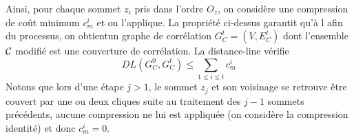 \documentclass[onecolumn, 12pt]{book}
\begin{document}
Ainsi, pour chaque sommet $z_i$ pris dans l'ordre $O_z$, on consid\`ere une compression de co\^ut minimum $c_m^i$ et on l'applique.
La propri\'et\'e ci-dessus garantit qu'\`a l afin du processus, on obtientun graphe de corr\'elation $G_C^t = (V, E_C^t)$ dont l'ensemble $\cal C$ modifi\'e est une couverture de corr\'elation. 
La distance-line v\'erifie  
$$DL( G_{C}^{0}, G_{C}^{t}) \le \sum_{1 \le i \le t } c_{m}^{i}$$
Notons que lors d'une \'etape $j > 1$, le sommet $z_j$ et son voisinage se retrouve \^etre couvert par une ou deux cliques suite au traitement des $j-1$ sommets pr\'ec\'edents, aucune compression ne lui est appliqu\'ee (on consid\`ere la compression identit\'e) et donc 
$c_{m}^{i} = 0$.
\end{document}
